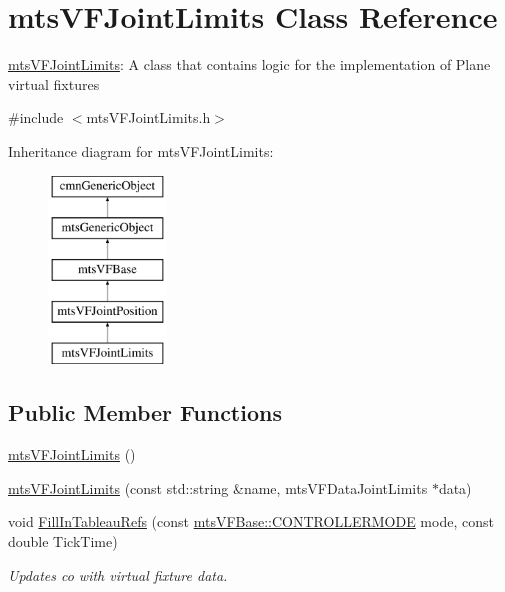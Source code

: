 \hypertarget{classmts_v_f_joint_limits}{}\section{mts\+V\+F\+Joint\+Limits Class Reference}
\label{classmts_v_f_joint_limits}


\hyperlink{classmts_v_f_joint_limits}{mts\+V\+F\+Joint\+Limits}\+: A class that contains logic for the implementation of Plane virtual fixtures  




{\ttfamily \#include $<$mts\+V\+F\+Joint\+Limits.\+h$>$}

Inheritance diagram for mts\+V\+F\+Joint\+Limits\+:\begin{figure}[H]
\begin{center}
\leavevmode
\includegraphics[height=5.000000cm]{d7/dfc/classmts_v_f_joint_limits}
\end{center}
\end{figure}
\subsection*{Public Member Functions}
\begin{DoxyCompactItemize}
\item 
\hyperlink{classmts_v_f_joint_limits_abe9ac6e3562399c3325f89f7d27c27b9}{mts\+V\+F\+Joint\+Limits} ()
\item 
\hyperlink{classmts_v_f_joint_limits_af9e36f30df5fc584acfa92b96ceb42be}{mts\+V\+F\+Joint\+Limits} (const std\+::string \&name, mts\+V\+F\+Data\+Joint\+Limits $\ast$data)
\item 
void \hyperlink{classmts_v_f_joint_limits_a8015490710d841d44bb9f4b73afe1ca3}{Fill\+In\+Tableau\+Refs} (const \hyperlink{classmts_v_f_base_a742dd08f8b70bafeb746cec14d9ee974}{mts\+V\+F\+Base\+::\+C\+O\+N\+T\+R\+O\+L\+L\+E\+R\+M\+O\+D\+E} mode, const double Tick\+Time)
\begin{DoxyCompactList}\small\item\em Updates co with virtual fixture data. \end{DoxyCompactList}\end{DoxyCompactItemize}
